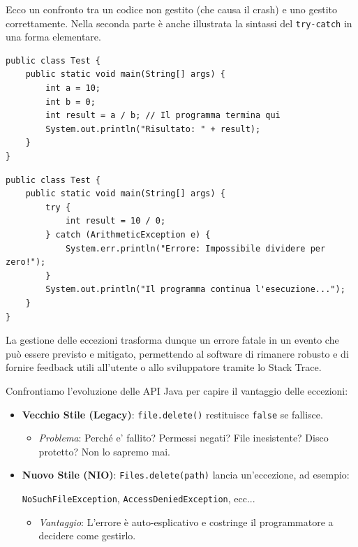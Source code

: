 Ecco un confronto tra un codice non gestito (che causa il crash) e uno gestito correttamente. Nella seconda parte è anche illustrata la sintassi del \texttt{try-catch} in una forma elementare. 

\begin{lstlisting}[caption=Esempio di crash]
public class Test {
    public static void main(String[] args) {
        int a = 10;
        int b = 0;
        int result = a / b; // Il programma termina qui
        System.out.println("Risultato: " + result); 
    }
}
\end{lstlisting}

\begin{lstlisting}[caption=Gestione dell'anomalia e sintassi base del \texttt{try-catch}]
public class Test {
    public static void main(String[] args) {
        try {
            int result = 10 / 0;
        } catch (ArithmeticException e) {
            System.err.println("Errore: Impossibile dividere per zero!");
        }
        System.out.println("Il programma continua l'esecuzione...");
    }
}
\end{lstlisting}

La gestione delle eccezioni trasforma dunque un errore fatale in un evento che può essere previsto e mitigato, permettendo al software di rimanere robusto e di fornire feedback utili all'utente o allo sviluppatore tramite lo Stack Trace.
\vspace{\baselineskip}

Confrontiamo l'evoluzione delle API Java per capire il vantaggio delle eccezioni:

\begin{itemize}
    \item \textbf{Vecchio Stile (Legacy)}: \texttt{file.delete()} restituisce \texttt{false} se fallisce. 
    \begin{itemize}
        \item \textit{Problema}: Perché e' fallito? Permessi negati? File inesistente? Disco protetto? Non lo sapremo mai.
    \end{itemize}
    \item \textbf{Nuovo Stile (NIO)}: \texttt{Files.delete(path)} lancia un'eccezione, ad esempio: 
    \begin{center}
        \texttt{NoSuchFileException}, \texttt{AccessDeniedException}, ecc...
    \end{center}
    
    \begin{itemize}
        \item \textit{Vantaggio}: L'errore è auto-esplicativo e costringe il programmatore a decidere come gestirlo.
    \end{itemize}
\end{itemize}
\vspace{\baselineskip}


